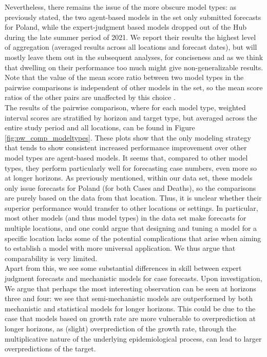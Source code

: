 Nevertheless, there remains the issue of the more obscure model types: as previously stated, the two agent-based models in the set only submitted forecasts for Poland, while the expert-judgment based models dropped out of the Hub during the late summer period of 2021. We report their results the highest level of aggregation (averaged results across all locations and forecast dates), but will mostly leave them out in the subsequent analyses, for conciseness and as we think that dwelling on their performance too much might give non-generalizable results. Note that the value of the mean score ratio between two model types in the pairwise comparisons is independent of other models in the set, so the mean score ratios of the other pairs are unaffected by this choice .\\
The results of the pairwise comparison, where for each model type, weighted interval scores are stratified by horizon and target type, but averaged across the entire study period and all locations, can be found in Figure \ref{fig:pw_comp_modeltypes}. These plots show that the only modeling strategy that tends to show consistent increased performance improvement over other model types are agent-based models. It seems that, compared to other model types, they perform particularly well for forecasting case numbers, even more so at longer horizons. As previously mentioned, within our data set, these models only issue forecasts for Poland (for both Cases and Deaths), so the comparisons are purely based on the data from that location. Thus, it is unclear whether their superior performance would transfer to other locations or settings. In particular, most other models (and thus model types) in the data set make forecasts for multiple locations, and one could argue that designing and tuning a model for a specific location lacks some of the potential complications that arise when aiming to establish a model with more universal application. We thus argue that comparability is very limited.\\
Apart from this, we see some substantial differences in skill between expert judgment forecasts and mechanistic models for case forecasts. Upon investigation,  \\
We argue that perhaps the most interesting observation can be seen at horizons three and four: we see that semi-mechanistic models are outperformed by both mechanistic and statistical models for longer horizons. This could be due to the case that models based on growth rate are more vulnerable to overprediction at longer horizons, as (slight) overprediction of the growth rate, through the multiplicative nature of the underlying epidemiological process, can lead to larger overpredictions of the target. \\
